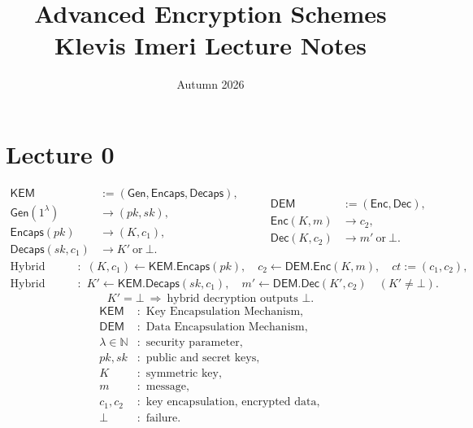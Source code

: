 \documentclass[12pt,a4paper]{article}
\title{Advanced Encryption Schemes\\\large Klevis Imeri Lecture Notes}
\author{}
\date{Autumn 2026}
\begin{document}
\maketitle
\tableofcontents

\setcounter{section}{-1}
\section{Lecture 0}

\begin{definition}
\[
\begin{aligned}
\mathsf{KEM}&:=(\mathsf{Gen},\mathsf{Encaps},\mathsf{Decaps}),\\
\mathsf{Gen}(1^\lambda)&\longrightarrow(pk,sk),\\
\mathsf{Encaps}(pk)&\longrightarrow(K,c_1),\\
\mathsf{Decaps}(sk,c_1)&\longrightarrow K'\ \text{or}\ \bot.
\end{aligned}
\qquad
\begin{aligned}
\mathsf{DEM}&:=(\mathsf{Enc},\mathsf{Dec}),\\
\mathsf{Enc}(K,m)&\longrightarrow c_2,\\
\mathsf{Dec}(K,c_2)&\longrightarrow m'\ \text{or}\ \bot.
\end{aligned}
\]
\[
\begin{aligned}
\text{Hybrid encryption}:\quad
&(K,c_1)\leftarrow\mathsf{KEM.Encaps}(pk),\quad
c_2\leftarrow\mathsf{DEM.Enc}(K,m),\quad ct:=(c_1,c_2),\\
\text{Hybrid decryption}:\quad
&K'\leftarrow\mathsf{KEM.Decaps}(sk,c_1),\quad
m'\leftarrow\mathsf{DEM.Dec}(K',c_2)
\quad(K'\ne\bot).
\end{aligned}
\]
\[
K'=\bot\ \Longrightarrow\ \text{hybrid decryption outputs }\bot.
\]
\[
\begin{aligned}
\mathsf{KEM}&:\text{ Key Encapsulation Mechanism},\\
\mathsf{DEM}&:\text{ Data Encapsulation Mechanism},\\
\lambda\in\mathbb{N}&:\text{ security parameter},\\
pk,sk&:\text{ public and secret keys},\\
K&:\text{ symmetric key},\\
m&:\text{ message},\\
c_1,c_2&:\text{ key encapsulation, encrypted data},\\
\bot&:\text{ failure}.
\end{aligned}
\]
\end{definition}
\end{document}
